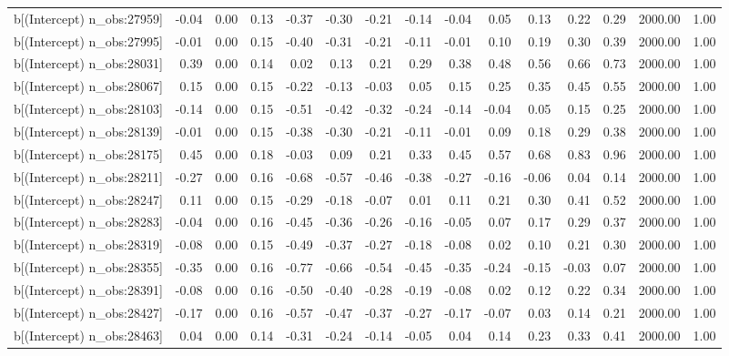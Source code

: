 \begin{table}[ht]
\begin{tabular}{rrrrrrrrrrrrrrr}
  b[(Intercept) n\_obs:27959] & -0.04 & 0.00 & 0.13 & -0.37 & -0.30 & -0.21 & -0.14 & -0.04 & 0.05 & 0.13 & 0.22 & 0.29 & 2000.00 & 1.00 \\ 
  b[(Intercept) n\_obs:27995] & -0.01 & 0.00 & 0.15 & -0.40 & -0.31 & -0.21 & -0.11 & -0.01 & 0.10 & 0.19 & 0.30 & 0.39 & 2000.00 & 1.00 \\ 
  b[(Intercept) n\_obs:28031] & 0.39 & 0.00 & 0.14 & 0.02 & 0.13 & 0.21 & 0.29 & 0.38 & 0.48 & 0.56 & 0.66 & 0.73 & 2000.00 & 1.00 \\ 
  b[(Intercept) n\_obs:28067] & 0.15 & 0.00 & 0.15 & -0.22 & -0.13 & -0.03 & 0.05 & 0.15 & 0.25 & 0.35 & 0.45 & 0.55 & 2000.00 & 1.00 \\ 
  b[(Intercept) n\_obs:28103] & -0.14 & 0.00 & 0.15 & -0.51 & -0.42 & -0.32 & -0.24 & -0.14 & -0.04 & 0.05 & 0.15 & 0.25 & 2000.00 & 1.00 \\ 
  b[(Intercept) n\_obs:28139] & -0.01 & 0.00 & 0.15 & -0.38 & -0.30 & -0.21 & -0.11 & -0.01 & 0.09 & 0.18 & 0.29 & 0.38 & 2000.00 & 1.00 \\ 
  b[(Intercept) n\_obs:28175] & 0.45 & 0.00 & 0.18 & -0.03 & 0.09 & 0.21 & 0.33 & 0.45 & 0.57 & 0.68 & 0.83 & 0.96 & 2000.00 & 1.00 \\ 
  b[(Intercept) n\_obs:28211] & -0.27 & 0.00 & 0.16 & -0.68 & -0.57 & -0.46 & -0.38 & -0.27 & -0.16 & -0.06 & 0.04 & 0.14 & 2000.00 & 1.00 \\ 
  b[(Intercept) n\_obs:28247] & 0.11 & 0.00 & 0.15 & -0.29 & -0.18 & -0.07 & 0.01 & 0.11 & 0.21 & 0.30 & 0.41 & 0.52 & 2000.00 & 1.00 \\ 
  b[(Intercept) n\_obs:28283] & -0.04 & 0.00 & 0.16 & -0.45 & -0.36 & -0.26 & -0.16 & -0.05 & 0.07 & 0.17 & 0.29 & 0.37 & 2000.00 & 1.00 \\ 
  b[(Intercept) n\_obs:28319] & -0.08 & 0.00 & 0.15 & -0.49 & -0.37 & -0.27 & -0.18 & -0.08 & 0.02 & 0.10 & 0.21 & 0.30 & 2000.00 & 1.00 \\ 
  b[(Intercept) n\_obs:28355] & -0.35 & 0.00 & 0.16 & -0.77 & -0.66 & -0.54 & -0.45 & -0.35 & -0.24 & -0.15 & -0.03 & 0.07 & 2000.00 & 1.00 \\ 
  b[(Intercept) n\_obs:28391] & -0.08 & 0.00 & 0.16 & -0.50 & -0.40 & -0.28 & -0.19 & -0.08 & 0.02 & 0.12 & 0.22 & 0.34 & 2000.00 & 1.00 \\ 
  b[(Intercept) n\_obs:28427] & -0.17 & 0.00 & 0.16 & -0.57 & -0.47 & -0.37 & -0.27 & -0.17 & -0.07 & 0.03 & 0.14 & 0.21 & 2000.00 & 1.00 \\ 
  b[(Intercept) n\_obs:28463] & 0.04 & 0.00 & 0.14 & -0.31 & -0.24 & -0.14 & -0.05 & 0.04 & 0.14 & 0.23 & 0.33 & 0.41 & 2000.00 & 1.00 \\ 

\end{tabular}
\end{table}
